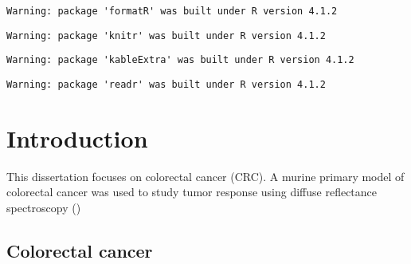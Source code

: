 \documentclass[11pt]{umnthesis}
\begin{document}
\tableofcontents{}



  \cleardoublepage
  \listoftables



  \cleardoublepage
  \listoffigures




\mainmatter 
\pagestyle{fancyplain} %

\begin{verbatim}
Warning: package 'formatR' was built under R version 4.1.2
\end{verbatim}

\begin{verbatim}
Warning: package 'knitr' was built under R version 4.1.2
\end{verbatim}

\begin{verbatim}
Warning: package 'kableExtra' was built under R version 4.1.2
\end{verbatim}

\begin{verbatim}
Warning: package 'readr' was built under R version 4.1.2
\end{verbatim}

\hypertarget{introduction}{%
\chapter{Introduction}\label{introduction}}

This dissertation focuses on colorectal cancer (CRC). A murine primary model of colorectal cancer was used to study tumor response using diffuse reflectance spectroscopy ()

\hypertarget{colorectal-cancer}{%
\section{Colorectal cancer}\label{colorectal-cancer}}
\end{document}
